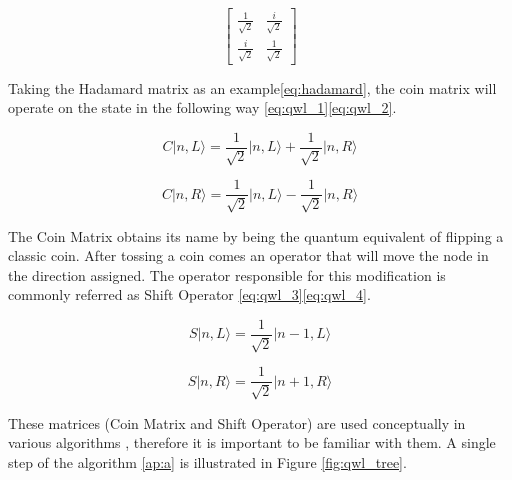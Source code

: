 \begin{equation}
\label{eq:qwl_symmetric}
\left[\begin{array}{cc}
\frac{1}{\sqrt{2}} & \frac{i}{\sqrt{2}}\\
\frac{i}{\sqrt{2}} & \frac{1}{\sqrt{2}}
\end{array}\right]
\end{equation}

Taking the Hadamard matrix as an example\ref{eq:hadamard}, the coin matrix will operate on the state in the following way \ref{eq:qwl_1}\ref{eq:qwl_2}\cite{Ambainis}.

\begin{equation}
\label{eq:qwl_1}
C\vert n, L\rangle = \frac{1}{\sqrt{2}} \vert n, L\rangle + \frac{1}{\sqrt{2}} \vert n, R\rangle
\end{equation}
  
\begin{equation}
\label{eq:qwl_2}
C\vert n, R\rangle = \frac{1}{\sqrt{2}} \vert n, L\rangle - \frac{1}{\sqrt{2}} \vert n, R\rangle
\end{equation} 

The Coin Matrix obtains its name by being the quantum equivalent of flipping a classic coin. After tossing a coin comes an operator that will move the node in the direction assigned. The operator responsible for this modification is commonly referred as Shift Operator \ref{eq:qwl_3}\ref{eq:qwl_4}. 

\begin{equation}
\label{eq:qwl_3}
S\vert n, L\rangle = \frac{1}{\sqrt{2}} \vert n-1, L\rangle
\end{equation}

\begin{equation}
\label{eq:qwl_4}
S\vert n, R\rangle = \frac{1}{\sqrt{2}} \vert n+1, R\rangle
\end{equation} 

These matrices (Coin Matrix and Shift Operator) are used conceptually in various algorithms \cite{Rieffel2011}, therefore it is important to be familiar with them. A single step of the algorithm \ref{ap:a} is illustrated in Figure \ref{fig:qwl_tree}.

